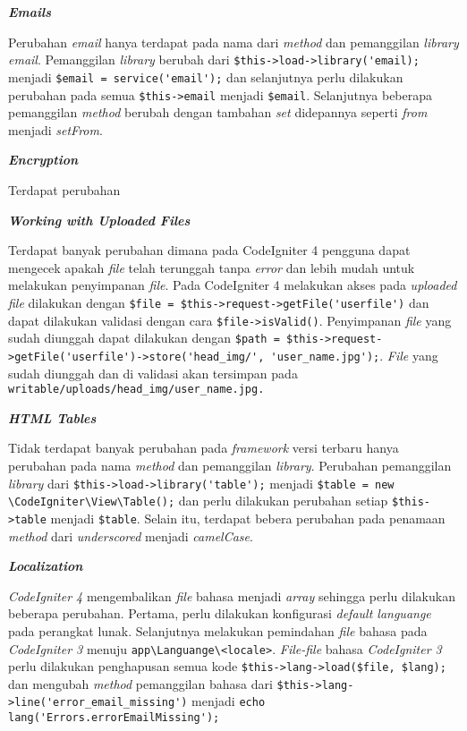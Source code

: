 \textbf{\textit{Emails}}

Perubahan \textit{email} hanya terdapat pada nama dari \textit{method} dan pemanggilan \textit{library email}. Pemanggilan  \textit{library} berubah dari \verb|$this->load->library('email);| menjadi \verb|$email = service('email');| dan selanjutnya perlu dilakukan perubahan pada semua \verb|$this->email| menjadi \verb|$email|. Selanjutnya beberapa pemanggilan \textit{method} berubah dengan tambahan \textit{set} didepannya seperti \textit{from} menjadi \textit{setFrom}.

\textbf{\textit{Encryption}}

Terdapat perubahan 

\textbf{\textit{Working with Uploaded Files}}

Terdapat banyak perubahan dimana pada CodeIgniter 4 pengguna dapat mengecek apakah \textit{file} telah terunggah tanpa \textit{error} dan lebih mudah untuk melakukan penyimpanan \textit{file}. Pada CodeIgniter 4 melakukan akses pada \textit{uploaded file} dilakukan dengan \verb|$file = $this->request->getFile('userfile')| dan dapat dilakukan validasi dengan cara \verb|$file->isValid()|. Penyimpanan \textit{file} yang sudah diunggah dapat dilakukan dengan \verb|$path = $this->request->getFile('userfile')->store('head_img/', 'user_name.jpg');|. \textit{File} yang sudah diunggah dan di validasi akan tersimpan pada \verb|writable/uploads/head_img/user_name.jpg.|

\textbf{\textit{HTML Tables}}

Tidak terdapat banyak perubahan pada \textit{framework} versi terbaru hanya perubahan pada nama \textit{method} dan pemanggilan \textit{library}. Perubahan pemanggilan \textit{library} dari \verb|$this->load->library('table');| menjadi \verb|$table = new \CodeIgniter\View\Table();| dan perlu dilakukan perubahan setiap \verb|$this->table| menjadi \verb|$table|. Selain itu, terdapat bebera perubahan pada penamaan \textit{method} dari \textit{underscored} menjadi \textit{camelCase}.


\textbf{\textit{Localization}}

\textit{CodeIgniter 4} mengembalikan \textit{file} bahasa menjadi \textit{array} sehingga perlu dilakukan beberapa perubahan. Pertama, perlu dilakukan konfigurasi \textit{default languange} 
pada perangkat lunak. Selanjutnya melakukan pemindahan \textit{file} bahasa pada \textit{CodeIgniter 3} menuju \verb|app\Languange\<locale>|. \textit{File-file} bahasa \textit{CodeIgniter 3} perlu dilakukan penghapusan semua kode \verb|$this->lang->load($file, $lang);| dan mengubah \textit{method} pemanggilan bahasa dari \verb|$this->lang->line('error_email_missing')| menjadi \verb|echo lang('Errors.errorEmailMissing');|
 

